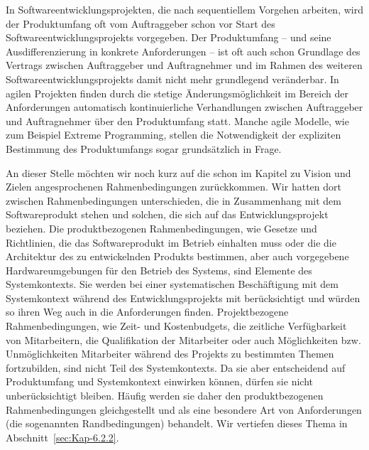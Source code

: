 In Softwareentwicklungsprojekten, die nach sequentiellem Vorgehen arbeiten, wird der Produktumfang oft vom Auftraggeber schon vor Start des Softwareentwicklungsprojekts vorgegeben. Der Produktumfang -- und seine Ausdifferenzierung in konkrete Anforderungen -- ist oft auch schon Grundlage des Vertrags zwischen Auftraggeber und Auftragnehmer und im Rahmen des weiteren Softwareentwicklungsprojekts damit nicht mehr grundlegend veränderbar. In agilen Projekten finden durch die stetige Änderungsmöglichkeit im Bereich der Anforderungen automatisch kontinuierliche Verhandlungen zwischen Auftraggeber und Auftragnehmer über den Produkt\-umfang statt. Manche agile Modelle, wie zum Beispiel Extreme Programming, stellen die Notwendigkeit der expliziten Bestimmung des Produktumfangs sogar grundsätzlich in Frage.


An dieser Stelle möchten wir noch kurz auf die schon im Kapitel zu Vision und Zielen angesprochenen Rahmenbedingungen zurückkommen. Wir hatten dort zwischen Rahmenbedingungen unterschieden, die in Zusammenhang mit dem Software\-produkt stehen und solchen, die sich auf das Entwicklungsprojekt beziehen. Die produkt\-bezogenen Rahmenbedingungen, wie Gesetze und Richtlinien, die das Softwareprodukt im Betrieb einhalten muss oder die die Architektur des zu entwickelnden Produkts bestimmen, aber auch vorgegebene Hardwareumgebungen für den Betrieb des Systems, sind Elemente des Systemkontexts. Sie werden bei einer systematischen Beschäftigung mit dem Systemkontext während des Entwicklungsprojekts mit berücksichtigt und würden so ihren Weg auch in die Anforderungen finden. Projektbezogene Rahmenbedingungen, wie Zeit- und Kostenbudgets, die zeitliche Verfügbarkeit von Mitarbeitern, die Qualifikation der Mitarbeiter oder auch Möglichkeiten bzw. Unmöglichkeiten Mitarbeiter während des Projekts zu bestimmten Themen fortzubilden, sind nicht Teil des Systemkontexts. Da sie aber entscheidend auf Produktumfang und Systemkontext einwirken können, dürfen sie nicht unberücksichtigt bleiben. Häufig werden sie daher den produktbezogenen Rahmenbedingungen gleichgestellt und als eine besondere Art von Anforderungen (die sogenannten Randbedingungen) behandelt. Wir vertiefen dieses Thema in Abschnitt~\ref{sec:Kap-6.2.2}.
